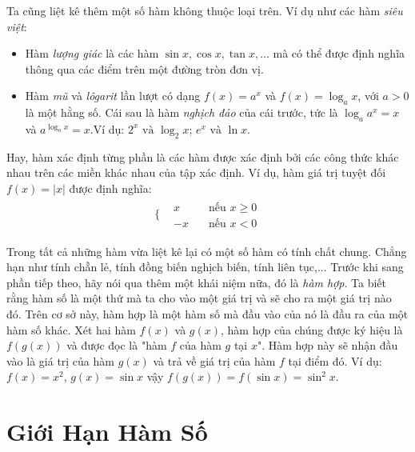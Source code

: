 Ta cũng liệt kê thêm một số hàm không thuộc loại trên.\newline
Ví dụ như các hàm \emph{siêu việt}:\begin{itemize}
    \item Hàm \emph{lượng giác} là các hàm $\sin x,\cos x, \tan x, \dots$ mà có thể được định nghĩa thông qua các điểm trên một đường tròn đơn vị.
    \item Hàm \emph{mũ} và \emph{lôgarit} lần lượt có dạng $f(x) = a^x$ và $f(x) = \log_a x$, với $a > 0$ là một hằng số. Cái sau là hàm \emph{nghịch đảo} của cái trước, tức là $\log_a a^x = x$ và $a^{\log_a x} = x$.\newline Ví dụ: $2^x \text{ và } \log_2 x$; $e^x \text{ và } \ln x$.
\end{itemize}
Hay, hàm xác định từng phần là các hàm được xác định bởi các công thức khác nhau trên các miền khác nhau của tập xác định.\newline
Ví dụ, hàm giá trị tuyệt đối $f(x) = |x|$ được định nghĩa:
\begin{equation*}
\begin{array}{cc}
  \Big\{ & 
    \begin{array}{cc}
      x  & \quad \text{nếu } x \geq 0 \\
      -x   & \quad \text{nếu } x < 0
    \end{array}
\end{array}
\end{equation*}

Trong tất cả những hàm vừa liệt kê lại có một số hàm có tính chất chung. Chẳng hạn như tính chẵn lẻ, tính đồng biến nghịch biến, tính liên tục,...\newline
Trước khi sang phần tiếp theo, hãy nói qua thêm một khái niệm nữa, đó là \emph{hàm hợp}. Ta biết rằng hàm số là một thứ mà ta cho vào một giá trị và sẽ cho ra một giá trị nào đó. Trên cơ sở này, hàm hợp là một hàm số mà đầu vào của nó là đầu ra của một hàm số khác.\newline
Xét hai hàm $f(x)$ và $g(x)$, hàm hợp của chúng được ký hiệu là $f(g(x))$ và được đọc là "hàm $f$ của hàm $g$ tại $x$". Hàm hợp này sẽ nhận đầu vào là giá trị của hàm $g(x)$ và trả về giá trị của hàm $f$ tại điểm đó.\newline    
Ví dụ: $f(x)=x^2$, $g(x)=\sin x$ vậy $f(g(x))=f(\sin x)=\sin^2 x$.

\section{Giới Hạn Hàm Số}
